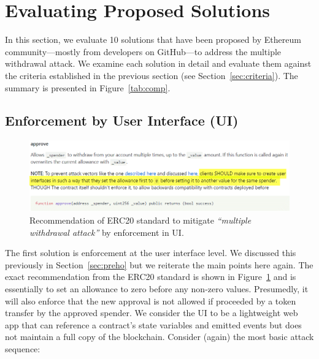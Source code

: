 
\section{Evaluating Proposed Solutions}\label{sec:eval}

In this section, we evaluate 10 solutions that have been proposed by Ethereum community---mostly from developers on GitHub---to address the multiple withdrawal attack. We examine each solution in detail and evaluate them against the criteria established in the previous section (see Section~\ref{sec:criteria}). The summary is presented in Figure~\ref{tab:comp}.

\subsection{Enforcement by User Interface (UI)}
\label{sec:enfui}

\begin{figure}[t!]
	\centering
	\includegraphics[width=1.0\linewidth]{figures/multiple_withdrawal_03.png}
	\caption{Recommendation of ERC20 standard to mitigate \textit{``multiple withdrawal attack''} by enforcement in UI.\label{fig:uie}}
\end{figure}

The first solution is enforcement at the user interface level. We discussed this previously in Section~\ref{sec:preho} but we reiterate the main points here again. The exact recommendation from the ERC20 standard is shown in Figure~\ref{fig:uie} and is essentially to set an allowance to zero before any non-zero values. Presumedly, it will also enforce that the new approval is not allowed if proceeded by a token transfer by the approved spender. We consider the UI to be a lightweight web app that can reference a contract's state variables and emitted events but does not maintain a full copy of the blockchain. Consider (again) the most basic attack sequence:


